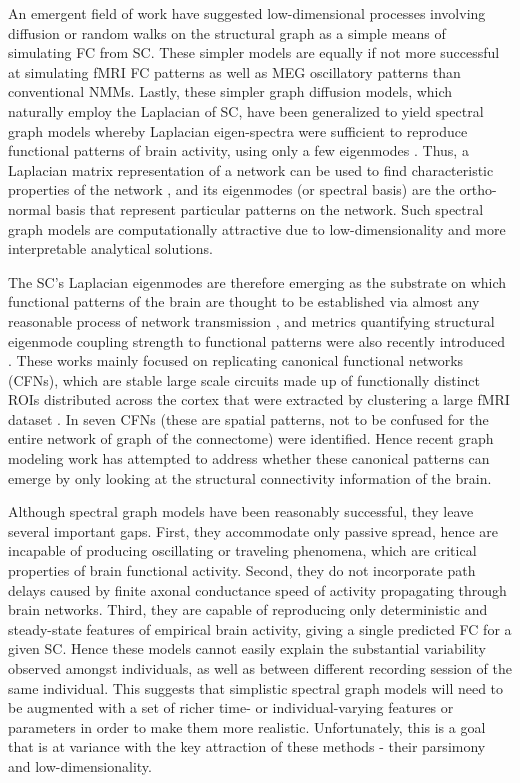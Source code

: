 \documentclass{article}
\begin{document}
An emergent field of work have suggested low-dimensional processes involving diffusion or random walks on the structural graph as a simple means of simulating FC from SC. These simpler models are equally if not more successful at simulating fMRI FC patterns \cite{abdelnour_network_2014, Atasoy2016} as well as MEG oscillatory patterns \cite{tewarie_how_2019, Raj2020} than conventional NMMs. Lastly, these simpler graph diffusion models, which naturally employ the Laplacian of SC, have been generalized to yield spectral graph models whereby Laplacian eigen-spectra were sufficient to reproduce functional patterns of brain activity, using only a few eigenmodes \cite{Abdelnour2018, Atasoy2016, Raj2020}. Thus, a Laplacian matrix representation of a network can be used to find characteristic properties of the network \cite{Stewart1999}, and its eigenmodes (or spectral basis) are the ortho-normal basis that represent particular patterns on the network. Such spectral graph models are computationally attractive due to low-dimensionality and more interpretable analytical solutions.

The SC's Laplacian eigenmodes are therefore emerging as the substrate on which functional patterns of the brain are thought to be established via almost any reasonable process of network transmission \cite{Abdelnour2018, Atasoy2016, robinson_eigenmodes_2016}, and metrics quantifying structural eigenmode coupling strength to functional patterns were also recently introduced \cite{preti_decoupling_2019}. These works mainly focused on replicating canonical functional networks (CFNs), which are stable large scale circuits made up of functionally distinct ROIs distributed across the cortex that were extracted by clustering a large fMRI dataset \cite{Yeo2011}. In \cite{Yeo2011} seven CFNs (these are spatial patterns, not to be confused for the entire network of graph of the connectome) were identified. Hence recent graph modeling work has attempted to address whether these canonical patterns can emerge by only looking at the structural connectivity information of the brain.

Although spectral graph models have been reasonably successful, they leave several important gaps. First, they accommodate only passive spread, hence are incapable of producing oscillating or traveling phenomena, which are critical properties of brain functional activity. Second, they do not incorporate path delays caused by finite axonal conductance speed of activity propagating through brain networks. Third, they are capable of reproducing only deterministic and steady-state features of empirical brain activity, giving a single predicted FC for a given SC. Hence these models cannot easily explain the substantial variability observed amongst individuals, as well as between different recording session of the same individual. This suggests that simplistic spectral graph models will need to be augmented with a set of richer time- or individual-varying features or parameters in order to make them more realistic. Unfortunately, this is a goal that is at variance with the key attraction of these methods - their parsimony and low-dimensionality.
\end{document}

